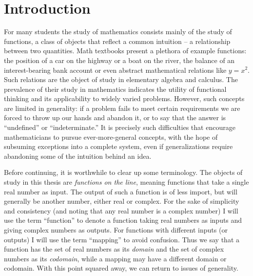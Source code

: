
  \chapter*{Introduction}

    For many students the study of mathematics consists mainly of the study of functions, a class of objects that reflect a common intuition -- a relationship between two quantities.
    Math textbooks present a plethora of example functions: the position of a car on the highway or a boat on the river, the balance of an interest-bearing bank account or even abstract mathematical relations like $y=x^2$.
    Such relations are the object of study in elementary algebra and calculus. 
    The prevalence of their study in mathematics indicates the utility of functional thinking and its applicability to widely varied problems.
    However, such concepts are limited in generality: if a problem fails to meet certain requirements we are forced to throw up our hands and abandon it, or to say that the answer is ``undefined'' or ``indeterminate.''
    It is precisely such difficulties that encourage mathematicians to pursue ever-more-general concepts, with the hope of subsuming exceptions into a complete system, even if generalizations require abandoning some of the intuition behind an idea.

    Before continuing, it is worthwhile to clear up some terminology.
    The objects of study in this thesis are \emph{functions on the line}, meaning functions that take a single real number as input.
    The output of such a function is of less import, but will generally be another number, either real or complex.
    For the sake of simplicity and consistency (and noting that any real number is a complex number) I will use the term ``function'' to denote a function taking real numbers as inputs and giving complex numbers as outputs.
    For functions with different inputs (or outputs) I will use the term ``mapping'' to avoid confusion.
    Thus we say that a function has the set of real numbers as its \emph{domain} and the set of complex numbers as its \emph{codomain}, while a mapping may have a different domain or codomain.
    With this point squared away, we can return to issues of generality.

